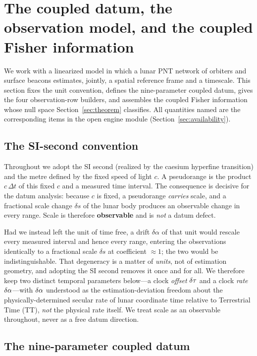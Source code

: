 \section{The coupled datum, the observation model, and the coupled Fisher information}
\label{sec:model}

We work with a linearized model in which a lunar PNT network of orbiters and surface
beacons estimates, jointly, a spatial reference frame and a timescale. This section fixes
the unit convention, defines the nine-parameter coupled datum, gives the four
observation-row builders, and assembles the coupled Fisher information whose null space
Section~\ref{sec:theorem} classifies. All quantities named  are the
corresponding items in the open engine module 
(Section~\ref{sec:availability}).

\subsection{The SI-second convention}
\label{sec:si}

Throughout we adopt the SI second (realized by the caesium hyperfine transition) and the
metre defined by the fixed speed of light $c$. A pseudorange is the product $c\,\Delta t$
of this fixed $c$ and a measured time interval. The consequence is decisive for the datum
analysis: because $c$ is fixed, a pseudorange \emph{carries} scale, and a fractional scale
change $\delta s$ of the lunar body produces an observable change in every range. Scale is
therefore \textbf{observable} and is \emph{not} a datum defect.

Had we instead left the unit of time free, a drift $\delta\alpha$ of that unit would
rescale every measured interval and hence every range, entering the observations
identically to a fractional scale $\delta s$ at coefficient $\approx1$; the two would be
indistinguishable. That degeneracy is a matter of \emph{units}, not of estimation
geometry, and adopting the SI second removes it once and for all. We therefore keep two
distinct temporal parameters below---a clock \emph{offset} $\delta\tau$ and a clock
\emph{rate} $\delta\alpha$---with $\delta\alpha$ understood as the estimation-deviation freedom
about the physically-determined secular rate of lunar coordinate time relative to
Terrestrial Time (TT), \emph{not} the physical rate itself. We treat scale as an
observable throughout, never as a free datum direction.

\subsection{The nine-parameter coupled datum}
\label{sec:datum}

